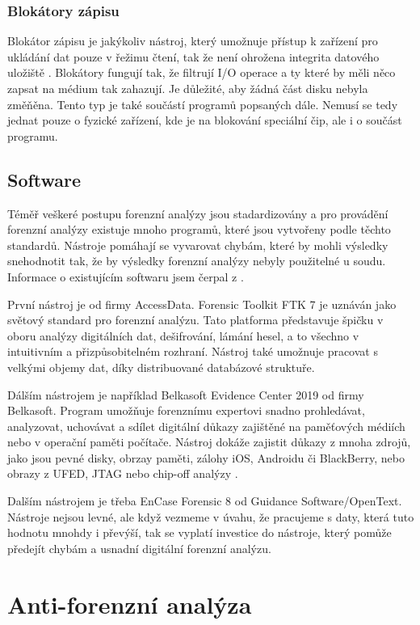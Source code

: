 \documentclass[thesis=B,czech]{FITthesis}[2012/06/26]
\begin{document}
\subsection{Blokátory zápisu}
Blokátor zápisu je jakýkoliv nástroj, který umožnuje přístup k zařízení pro ukládání dat pouze v řežimu čtení, tak že není ohrožena integrita datového uložiště \cite{for_hard2}. Blokátory fungují tak, že filtrují I/O operace a ty které by měli něco zapsat na médium tak zahazují. Je důležité, aby žádná část disku nebyla změňěna. Tento typ je také součástí programů popsaných dále. Nemusí se tedy jednat pouze o fyzické zařízení, kde je na blokování speciální čip, ale i o součást programu.

\section{Software}

Téměř veškeré postupu forenzní analýzy jsou stadardizovány a pro provádění forenzní analýzy existuje mnoho programů, které jsou vytvořeny podle těchto standardů. Nástroje pomáhají se vyvarovat chybám, které by mohli výsledky snehodnotit tak, že by výsledky forenzní analýzy nebyly použitelné u soudu. Informace o existujícím softwaru jsem čerpal z \cite{for_soft}.

První nástroj je od firmy AccessData. Forensic Toolkit FTK 7 je uznáván jako světový standard pro forenzní analýzu. Tato platforma představuje špičku v oboru analýzy digitálních dat, dešifrování, lámání hesel, a to všechno v intuitivním a přizpůsobitelném rozhraní. Nástroj také umožnuje pracovat s velkými objemy dat, díky distribuované databázové struktuře.

Dálším nástrojem je například Belkasoft Evidence Center 2019 od firmy Belkasoft. Program umožňuje forenznímu expertovi snadno prohledávat, analyzovat, uchovávat a sdílet digitální důkazy zajištěné na paměťových médiích nebo v operační paměti počítače. Nástroj dokáže zajistit důkazy z mnoha zdrojů, jako jsou pevné disky, obrzay paměti, zálohy iOS, Androidu či BlackBerry, nebo obrazy z UFED, JTAG nebo chip-off analýzy \cite{for_soft}.

Dalším nástrojem je třeba EnCase Forensic 8 od Guidance Software/OpenText. Nástroje nejsou levné, ale když vezmeme v úvahu, že pracujeme s daty, která tuto hodnotu mnohdy i převýší, tak se vyplatí investice do nástroje, který pomůže předejít chybám a usnadní digitální forenzní analýzu.

\chapter{Anti-forenzní analýza}
\end{document}

